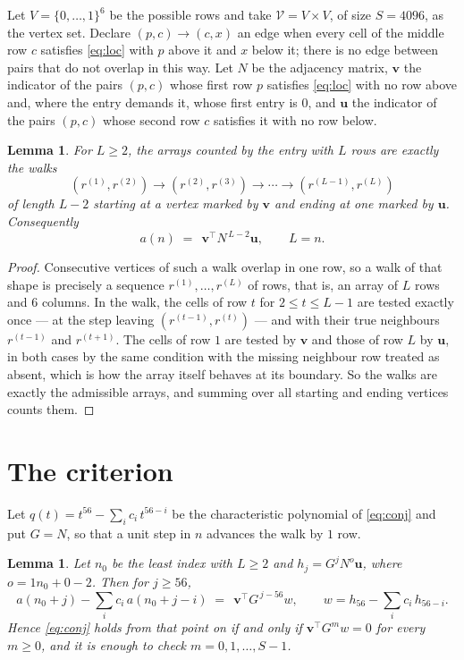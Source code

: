 \documentclass[11pt,a4paper]{article}
\theoremstyle{plain}
\newtheorem{lemma}[theorem]{Lemma}
\theoremstyle{definition}
\begin{document}
Let $V=\{0,\dots,1\}^{6}$ be the possible rows and take
$\mathcal V=V\times V$, of size $S=4096$, as the vertex set. Declare $(p,c)\to(c,x)$ an edge
when every cell of the middle row $c$ satisfies \eqref{eq:loc} with $p$ above it and $x$
below it; there is no edge between pairs that do not overlap in this way. Let $N$ be the
adjacency matrix, $\mathbf{v}$ the indicator of the pairs $(p,c)$ whose first row $p$
satisfies \eqref{eq:loc} with no row above and, where the entry demands it, whose first entry is $0$, and $\mathbf{u}$ the indicator of
the pairs $(p,c)$ whose second row $c$ satisfies it with no row below.

\begin{lemma}\label{lem:walk}
For $L\ge2$, the arrays counted by the entry with $L$ rows are exactly the walks
\[
(r^{(1)},r^{(2)})\to(r^{(2)},r^{(3)})\to\cdots\to(r^{(L-1)},r^{(L)})
\]
of length $L-2$ starting at a vertex marked by $\mathbf{v}$ and ending at one marked by
$\mathbf{u}$. Consequently
\[
a(n)\;=\;\,\mathbf{v}^{\!\top}N^{\,L-2}\mathbf{u},\qquad L=n .
\]
\end{lemma}

\begin{proof}
Consecutive vertices of such a walk overlap in one row, so a walk of that shape is
precisely a sequence $r^{(1)},\dots,r^{(L)}$ of rows, that is, an array of $L$ rows
and $6$ columns. In the walk, the cells of row $t$ for $2\le t\le L-1$ are tested
exactly once --- at the step leaving $(r^{(t-1)},r^{(t)})$ --- and with their true
neighbours $r^{(t-1)}$ and $r^{(t+1)}$. The cells of row $1$ are tested by
$\mathbf{v}$ and those of row $L$ by $\mathbf{u}$, in both cases by the same condition
with the missing neighbour row treated as absent, which is how the array itself behaves at
its boundary. So the walks are exactly the admissible arrays, and summing over all starting
and ending vertices counts them.
\end{proof}

\section{The criterion}

Let $q(t)=t^{56}-\sum_i c_i\,t^{56-i}$ be the characteristic polynomial of
\eqref{eq:conj} and put $G=N$, so that a unit step in $n$ advances the walk by
$1$ row.

\begin{lemma}\label{lem:crit}
Let $n_0$ be the least index with $L\ge2$ and $h_j=G^{j}N^{o}\mathbf{u}$, where
$o=1n_0+0-2$. Then for $j\ge56$,
\[
a(n_0+j)-\sum_i c_i\,a(n_0+j-i)\;=\;\,\mathbf{v}^{\!\top}G^{\,j-56}w,
\qquad w=h_{56}-\sum_i c_i\,h_{56-i} .
\]
Hence \eqref{eq:conj} holds from that point on if and only if
$\mathbf{v}^{\!\top}G^{m}w=0$ for every $m\ge0$, and it is enough to check
$m=0,1,\dots,S-1$.
\end{lemma}
\end{document}

